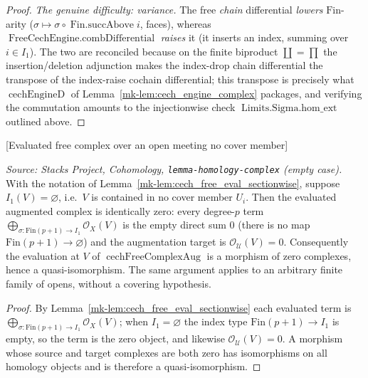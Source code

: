 \begin{proof}
  \emph{The genuine difficulty: variance.} The free \emph{chain} differential
  \emph{lowers} \(\mathrm{Fin}\)-arity (\(\sigma \mapsto \sigma \circ
  \operatorname{Fin.succAbove} i\), faces), whereas
  \(\operatorname{FreeCechEngine.combDifferential}\) \emph{raises} it (it inserts an
  index, summing over \(i \in I_1\)). The two are reconciled because on the finite
  biproduct \(\coprod = \prod\) the insertion/deletion adjunction makes the index-drop
  chain differential the transpose of the index-raise cochain differential; this
  transpose is precisely what \(\operatorname{cechEngineD}\) of
  Lemma~\ref{mk-lem:cech_engine_complex} packages, and verifying the commutation amounts to
  the injectionwise check \(\operatorname{Limits.Sigma.hom\_ext}\) outlined above.
\end{proof}

\begin{lemma}

[Evaluated free complex over an open meeting no cover member]
  \label{mk-lem:cech_free_eval_empty}

  \textit{Source: Stacks Project, Cohomology, \texttt{lemma-homology-complex}
  (empty case).}
  With the notation of Lemma~\ref{mk-lem:cech_free_eval_sectionwise}, suppose
  \(I_1(V) = \varnothing\), i.e.\ \(V\) is contained in no cover member \(U_i\). Then
  the evaluated augmented complex is identically zero: every degree-\(p\) term
  \(\bigoplus_{\sigma : \mathrm{Fin}(p+1) \to I_1} \mathcal{O}_X(V)\) is the empty
  direct sum \(0\) (there is no map \(\mathrm{Fin}(p+1) \to \varnothing\)) and the
  augmentation target is \(\mathcal{O}_{\mathcal{U}}(V) = 0\). Consequently the
  evaluation at \(V\) of \(\operatorname{cechFreeComplexAug}\) is a morphism of zero
  complexes, hence a quasi-isomorphism. The same argument applies to an arbitrary
  finite family of opens, without a covering hypothesis.
\end{lemma}

\begin{proof}
  By Lemma~\ref{mk-lem:cech_free_eval_sectionwise} each evaluated term is
  \(\bigoplus_{\sigma : \mathrm{Fin}(p+1) \to I_1} \mathcal{O}_X(V)\); when
  \(I_1 = \varnothing\) the index type \(\mathrm{Fin}(p+1) \to I_1\) is empty, so the
  term is the zero object, and likewise \(\mathcal{O}_{\mathcal{U}}(V) = 0\). A
  morphism whose source and target complexes are both zero has isomorphisms on all
  homology objects and is therefore a quasi-isomorphism.
\end{proof}

